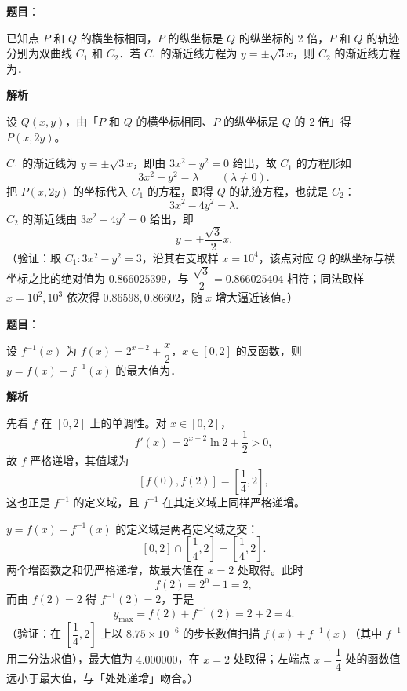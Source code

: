 \begin{answer}

\textbf{题目}：

已知点 \(P\) 和 \(Q\) 的横坐标相同，\(P\) 的纵坐标是 \(Q\) 的纵坐标的 2 倍，\(P\) 和 \(Q\) 的轨迹分别为双曲线 \(C_{1}\) 和 \(C_{2}\)．若 \(C_{1}\) 的渐近线方程为 \(y=\pm\sqrt{3}x\)，则 \(C_{2}\) 的渐近线方程为\gkblank{}．

\textbf{解析}

设 \(Q(x,y)\)，由「\(P\) 和 \(Q\) 的横坐标相同、\(P\) 的纵坐标是 \(Q\) 的 \(2\) 倍」得 \(P(x,2y)\)。

\(C_{1}\) 的渐近线为 \(y=\pm\sqrt{3}x\)，即由 \(3x^{2}-y^{2}=0\) 给出，故 \(C_{1}\) 的方程形如
\nopagebreak[4]
\[
3x^{2}-y^{2}=\lambda\qquad(\lambda\neq0).
\]
把 \(P(x,2y)\) 的坐标代入 \(C_{1}\) 的方程，即得 \(Q\) 的轨迹方程，也就是 \(C_{2}\)：
\nopagebreak[4]
\[
3x^{2}-4y^{2}=\lambda.
\]
\(C_{2}\) 的渐近线由 \(3x^{2}-4y^{2}=0\) 给出，即
\nopagebreak[4]
\[
y=\pm\frac{\sqrt{3}}{2}x.
\]
（验证：取 \(C_{1}:3x^{2}-y^{2}=3\)，沿其右支取样 \(x=10^{4}\)，该点对应 \(Q\) 的纵坐标与横坐标之比的绝对值为 \(0.866025399\)，与 \(\dfrac{\sqrt{3}}{2}=0.866025404\) 相符；同法取样 \(x=10^{2},10^{3}\) 依次得 \(0.86598,0.86602\)，随 \(x\) 增大逼近该值。）


\end{answer}
\begin{answer}

\textbf{题目}：

设 \(f^{-1}(x)\) 为 \(f(x)=2^{x-2}+\dfrac{x}{2}\)，\(x\in[0,2]\) 的反函数，则 \(y=f(x)+f^{-1}(x)\) 的最大值为\gkblank{}．

\textbf{解析}

先看 \(f\) 在 \([0,2]\) 上的单调性。对 \(x\in[0,2]\)，
\nopagebreak[4]
\[
f'(x)=2^{x-2}\ln2+\frac{1}{2}>0,
\]
故 \(f\) 严格递增，其值域为
\nopagebreak[4]
\[
\left[f(0),f(2)\right]=\left[\frac{1}{4},2\right],
\]
这也正是 \(f^{-1}\) 的定义域，且 \(f^{-1}\) 在其定义域上同样严格递增。

\(y=f(x)+f^{-1}(x)\) 的定义域是两者定义域之交：
\nopagebreak[4]
\[
[0,2]\cap\left[\frac{1}{4},2\right]=\left[\frac{1}{4},2\right].
\]
两个增函数之和仍严格递增，故最大值在 \(x=2\) 处取得。此时
\nopagebreak[4]
\[
f(2)=2^{0}+1=2,
\]
而由 \(f(2)=2\) 得 \(f^{-1}(2)=2\)，于是
\nopagebreak[4]
\[
y_{\max}=f(2)+f^{-1}(2)=2+2=4.
\]
（验证：在 \(\left[\dfrac{1}{4},2\right]\) 上以 \(8.75\times10^{-6}\) 的步长数值扫描 \(f(x)+f^{-1}(x)\)（其中 \(f^{-1}\) 用二分法求值），最大值为 \(4.000000\)，在 \(x=2\) 处取得；左端点 \(x=\dfrac{1}{4}\) 处的函数值远小于最大值，与「处处递增」吻合。）


\end{answer}
